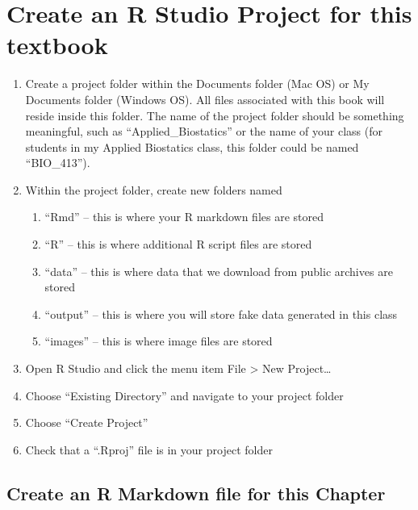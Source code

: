 \documentclass[]{book}
\providecommand{\tightlist}{%
  \setlength{\itemsep}{0pt}\setlength{\parskip}{0pt}}
\begin{document}
\hypertarget{create-an-r-studio-project-for-this-textbook}{%
\section{Create an R Studio Project for this textbook}\label{create-an-r-studio-project-for-this-textbook}}

\begin{enumerate}
\def\labelenumi{\arabic{enumi}.}
\tightlist
\item
  Create a project folder within the Documents folder (Mac OS) or My Documents folder (Windows OS). All files associated with this book will reside inside this folder. The name of the project folder should be something meaningful, such as ``Applied\_Biostatics'' or the name of your class (for students in my Applied Biostatics class, this folder could be named ``BIO\_413'').
\item
  Within the project folder, create new folders named

  \begin{enumerate}
  \def\labelenumii{\arabic{enumii}.}
  \tightlist
  \item
    ``Rmd'' -- this is where your R markdown files are stored
  \item
    ``R'' -- this is where additional R script files are stored
  \item
    ``data'' -- this is where data that we download from public archives are stored
  \item
    ``output'' -- this is where you will store fake data generated in this class
  \item
    ``images'' -- this is where image files are stored
  \end{enumerate}
\item
  Open R Studio and click the menu item File \textgreater{} New Project\ldots{}
\item
  Choose ``Existing Directory'' and navigate to your project folder
\item
  Choose ``Create Project''
\item
  Check that a ``.Rproj'' file is in your project folder
\end{enumerate}

\hypertarget{create-an-r-markdown-file-for-this-chapter}{%
\subsection{Create an R Markdown file for this Chapter}\label{create-an-r-markdown-file-for-this-chapter}}
\end{document}
